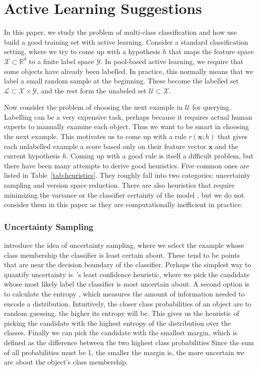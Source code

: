 \documentclass[fleqn,10pt,lineno]{wlpeerj} %
\newcommand{\X}{\mathcal{X}}
\newcommand{\Y}{\mathcal{Y}}
\newcommand{\Unlabelled}{\mathcal{U}}
\newcommand{\Labelled}{\mathcal{L}}
\begin{document}
\section*{Active Learning Suggestions}

In this paper, we study the problem of multi-class classification and how use
build a good training set with active learning. Consider a standard
classification setting, where we try to come up with a hypothesis $h$ that maps
the feature space $\X \subset \mathbb{R}^d$ to a finite label space $\Y$. In
pool-based active learning, we require that some objects have already been
labelled. In practice, this normally means that we label a small random sample
at the beginning. These become the labelled set $\Labelled \subset \X \times
\Y$, and the rest form the unabeled set $\Unlabelled \subset \X$.

Now consider the problem of choosing the next example in $\Unlabelled$ for
querying. Labelling can be a very expensive task, perhaps because it requires
actual human experts to manually examine each object. Thus we want to be smart
in choosing the next example. This motivates us to come up with a rule
$r(\bm{x}; h)$ that gives each unlabelled example a score based only on their
feature vector $\bm{x}$ and the current hypothesis $h$. Coming up with a good
rule is itself a difficult problem, but there have been many attempts to derive
good heuristics. Five common ones are listed in Table~\ref{tab:heuristics}.
They roughly fall into two categories: uncertainty sampling and version space
reduction. There are also heuristics that require minimizing the variance
or the classifier certainty of the model \citep{schein07}, but we do not
consider them in this paper as they are computationally inefficient in
practice.

\subsubsection*{Uncertainty Sampling}

\cite{lewis94} introduce the idea of uncertainty sampling, where we select the
example whose class membership the classifier is least certain about. These
tend to be points that are near the decision boundary of the classifier.
Perhaps the simplest way to quantify uncertainty is~\cite{culotta05}'s least
confidence heuristic, where we pick the candidate whose most likely label the
classifier is most uncertain about. A second option is to calculate the entropy
\citep{shannon48}, which measures the amount of information needed to encode a
distribution. Intuitively, the closer class probabilities of an object are to
random guessing, the higher its entropy will be. This gives us the heuristic of
picking the candidate with the highest entropy of the distribution over the
classes. Finally we can pick the candidate with the smallest margin, which is
defined as the difference between the two highest class probabilities
\citep{scheffer01} Since the sum of all probabilities must be 1, the smaller
the margin is, the more uncertain we are about the object's class membership.
\end{document}
